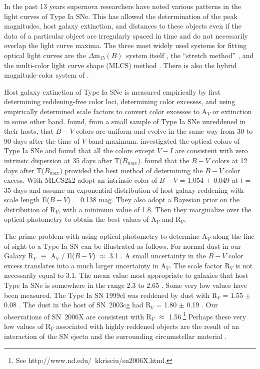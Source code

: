 \documentclass[12pt,preprint,psfig,epsf]{aastex}
\newcommand{\dmm}{\mbox{$\Delta$m$_{15}(B)$}}
\begin{document}
In the past 13 years supernova researchers have noted various patterns in the
light curves of Type Ia SNe.  This has allowed the determination of the peak
magnitudes, host galaxy extinction, and distances to these objects even if the
data of a particular object are irregularly spaced in time and do not necessarily
overlap the light curve maxima.  The three most widely used systems for fitting
optical light curves are the \dmm\ system itself \citep{Ham_etal96, Phi_etal99,
Ger_etal04, Pri_etal06}, the ``stretch method'' \citep{Per_etal97, Gol_etal01,
Kno_etal03}, and the multi-color light curve shape (MLCS) method
\citep{Rie_etal96a, Rie_etal98, Jha_etal06b}.  There is also the hybrid 
magnitude-color system of \citet{Wan_etal03a}.

Host galaxy extinction of Type Ia SNe is measured empirically by
first determining reddening-free color loci, determining color
excesses, and using empirically determined scale factors to convert
color excesses to A$_V$ or extinction in some other band.  \citet{Lir95}
found, from a small sample of Type Ia SNe unreddened in their hosts,
that $B-V$ colors are uniform and evolve in the same way from 30
to 90 days after the time of $V$-band maximum.  \citet{Nob_etal03}
investigated the optical colors of Type Ia SNe and found that all the
colors except $V-I$ are consistent with zero intrinsic dispersion at
35 days after T($B_{max}$).  \citet{Wan_etal05} found that the $B-V$
colors at 12 days after T($B_{max}$) provided the best method of determining
the $B-V$ color excess.  With MLCS2k2 \citet{Jha_etal06b} adopt an intrinsic
color of $B-V$ = 1.054 $\pm$ 0.049 at $t$ = 35 days and assume an exponential
distribution of host galaxy reddening with scale length E($B-V$) = 0.138 mag.
They also adopt a Bayesian prior on the distribution of R$_V$, with a minimum value
of 1.8.  Then they marginalize over the optical photometry to obtain the
best values of A$_V$ and R$_V$.

The prime problem with using optical photometry to determine A$_V$ along the line
of sight to a Type Ia SN can be illustrated as follows.  For normal dust in our
Galaxy R$_V$ $\equiv$ A$_V$ / E($B-V$) $\approx$ 3.1 \citep{Car_etal89}.  A small
uncertainty in the $B-V$ color excess translates into a much larger uncertainty
in A$_V$.  The scale factor R$_V$ is not necessarily equal to 3.1.  The mean
value most appropriate to galaxies that host Type Ia SNe is somewhere in the
range 2.3 to 2.65 \citep{Rie_etal96b, Alt_etal04, Rei_etal05, Wan_etal06,
Jha_etal06b}. Some very low values have been measured.  The Type Ia SN 1999cl was
reddened by dust with R$_V$ = 1.55 $\pm$ 0.08 \citep {Kri_etal06}.  The dust in
the host of SN~2003cg had R$_V$ = 1.80 $\pm$ 0.19 \citep{Eli_etal06}.  Our
observations of SN~2006X are consistent with R$_V$ $\approx$ 
1.56.\footnote[13]{See http://www.nd.edu/~kkrisciu/sn2006X.html.}
Perhaps these very low values of R$_V$ associated with highly reddened objects
are the result of an interaction of the SN ejecta and the surrounding circumstellar
material \citep{Wan05}.
\end{document}
